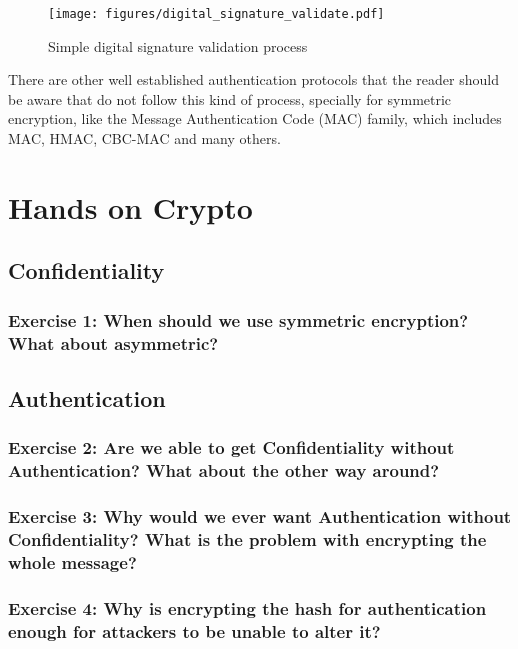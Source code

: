 \documentclass[12pt,a4paper]{article}
\theoremstyle{definition}
\begin{document}
\begin{figure}[h]
    \centering
    \texttt{[image: figures/digital\_signature\_validate.pdf]}
    \caption{Simple digital signature validation process}
    \label{fig:ds_validate}
\end{figure}

There are other well established authentication protocols that the reader should be aware that do not follow this kind of process, specially for symmetric encryption, like the Message Authentication Code (MAC) family, which includes MAC, HMAC, CBC-MAC and many others.




\section{Hands on Crypto}

\subsection*{Confidentiality}
\subsubsection*{Exercise 1: When should we use symmetric encryption? What about asymmetric?}

\subsection*{Authentication}
\subsubsection*{Exercise 2: Are we able to get Confidentiality without Authentication? What about the other way around?}

\subsubsection*{Exercise 3: Why would we ever want Authentication without Confidentiality? What is the problem with encrypting the whole message?}

\subsubsection*{Exercise 4: Why is encrypting the hash for authentication enough for attackers to be unable to alter it?}
\end{document}
